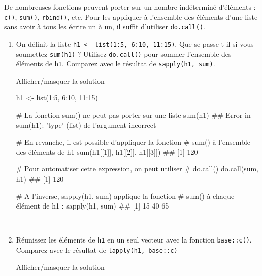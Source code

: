 \documentclass[12pt,]{article}
\newenvironment{Shaded}{}{}
\newcommand{\KeywordTok}[1]{\textcolor[rgb]{0.00,0.00,1.00}{{#1}}}
\newcommand{\DecValTok}[1]{{#1}}
\newcommand{\StringTok}[1]{\textcolor[rgb]{0.00,0.50,0.50}{{#1}}}
\newcommand{\CommentTok}[1]{\textcolor[rgb]{0.00,0.50,0.00}{{#1}}}
\newcommand{\NormalTok}[1]{{#1}}
\begin{document}
De nombreuses fonctions peuvent porter sur un nombre indéterminé
d'éléments : \texttt{c()}, \texttt{sum()}, \texttt{rbind()}, etc. Pour
les appliquer à l'ensemble des éléments d'une liste sans avoir à tous
les écrire un à un, il suffit d'utiliser \texttt{do.call()}.

\begin{enumerate}
\def\labelenumi{\alph{enumi}.}
\item
  On définit la liste
  \texttt{h1\ \textless{}-\ list(1:5,\ 6:10,\ 11:15)}. Que se passe-t-il
  si vous soumettez \texttt{sum(h1)} ? Utilisez \texttt{do.call()} pour
  sommer l'ensemble des éléments de \texttt{h1}. Comparez avec le
  résultat de \texttt{sapply(h1,\ sum)}.

  Afficher/masquer la solution

  \hypertarget{sol29}{}
\begin{Shaded}
\begin{Highlighting}[]
\NormalTok{h1 <-}\StringTok{ }\KeywordTok{list}\NormalTok{(}\DecValTok{1}\NormalTok{:}\DecValTok{5}\NormalTok{, }\DecValTok{6}\NormalTok{:}\DecValTok{10}\NormalTok{, }\DecValTok{11}\NormalTok{:}\DecValTok{15}\NormalTok{)}

\CommentTok{# La fonction sum() ne peut pas porter sur une liste}
\KeywordTok{sum}\NormalTok{(h1)}
\NormalTok{## Error in sum(h1): 'type' (list) de l'argument incorrect}

\CommentTok{# En revanche, il est possible d'appliquer la fonction}
\CommentTok{# sum() à l'ensemble des éléments de h1}
\KeywordTok{sum}\NormalTok{(h1[[}\DecValTok{1}\NormalTok{]], h1[[}\DecValTok{2}\NormalTok{]], h1[[}\DecValTok{3}\NormalTok{]])}
\NormalTok{## [1] 120}

\CommentTok{# Pour automatiser cette expression, on peut utiliser}
\CommentTok{# do.call()}
\KeywordTok{do.call}\NormalTok{(sum, h1)}
\NormalTok{## [1] 120}

\CommentTok{# A l'inverse, sapply(h1, sum) applique la fonction}
\CommentTok{# sum() à chaque élément de h1 : }
\KeywordTok{sapply}\NormalTok{(h1, sum)}
\NormalTok{## [1] 15 40 65}
\end{Highlighting}
\end{Shaded}

  ~
\item
  Réunissez les éléments de \texttt{h1} en un seul vecteur avec la
  fonction \texttt{base::c()}. Comparez avec le résultat de
  \texttt{lapply(h1,\ base::c)}

  Afficher/masquer la solution


\end{enumerate}
\end{document}
